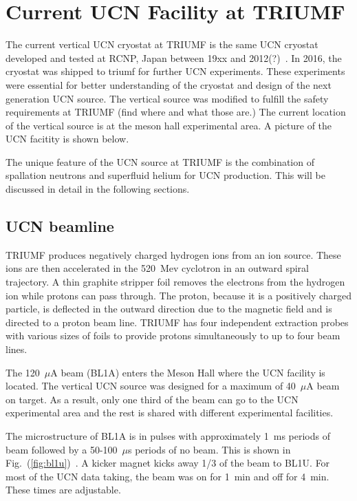 \chapter{Current UCN Facility at TRIUMF}


The current vertical UCN cryostat at TRIUMF is the same UCN cryostat
developed and tested at RCNP, Japan between 19xx and
2012(?)~\cite{masuda2002spallation,masuda2012spallation}.  In 2016,
the cryostat was shipped to triumf for further UCN experiments. These
experiments were essential for better understanding of the cryostat
and design of the next generation UCN source.  The vertical source was
modified to fulfill the safety requirements at TRIUMF (find where and
what those are.)  The current location of the vertical source is at
the meson hall experimental area.  A picture of the UCN facitity is
shown below.

The unique feature of the UCN source at TRIUMF is the combination of
spallation neutrons and superfluid helium for UCN production. This
will be discussed in detail in the following sections.

\section{UCN beamline}
TRIUMF produces negatively charged hydrogen ions from an ion
source. These ions are then accelerated in the 520~Mev cyclotron in an
outward spiral trajectory. A thin graphite stripper foil removes the
electrons from the hydrogen ion while protons can pass through. The
proton, because it is a positively charged particle, is deflected in
the outward direction due to the magnetic field and is directed to a
proton beam line. TRIUMF has four independent extraction probes with
various sizes of foils to provide protons simultaneously to up to four
beam lines.


The 120~$\mu$A beam (BL1A) enters the Meson Hall where the UCN
facility is located. The vertical UCN source was designed for a
maximum of 40~$\mu$A beam on target. As a result, only one third of
the beam can go to the UCN experimental area and the rest is shared
with different experimental facilities.

The microstructure of BL1A is in pulses with approximately 1~ms
periods of beam followed by a 50-100~$\mu$s periods of no beam.  This
is shown in Fig.~(\ref{fig:bl1u})~\cite{Nick_thesis}. A
kicker magnet kicks away 1/3 of the beam to BL1U. For most of the UCN
data taking, the beam was on for 1~min and off for 4~min. These times
are adjustable.

